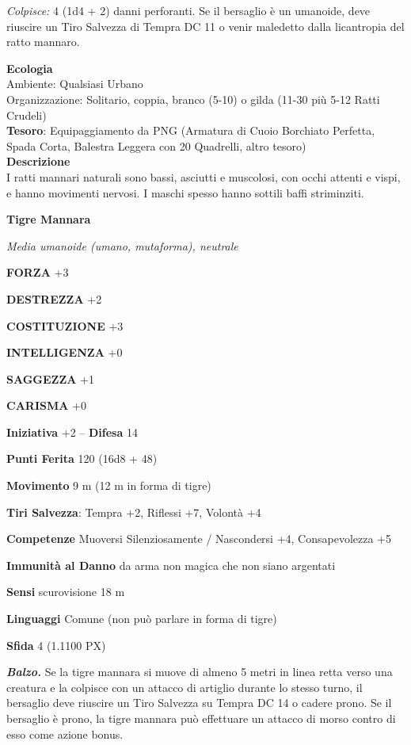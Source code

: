 \begin{multicols}{2}
	\textit{Colpisce:} 4 (1d4 + 2) danni perforanti. Se il bersaglio è un umanoide, deve riuscire un Tiro Salvezza di Tempra DC 11 o venir maledetto dalla licantropia del ratto mannaro.

	\textbf{Ecologia}\\
	Ambiente: Qualsiasi Urbano\\
	Organizzazione: Solitario, coppia, branco (5-10) o gilda (11-30 più 5-12 Ratti Crudeli)\\
	\textbf{Tesoro}: Equipaggiamento da PNG (Armatura di Cuoio Borchiato Perfetta, Spada Corta, Balestra Leggera con 20 Quadrelli, altro tesoro)\\
	\textbf{Descrizione}\\
	I ratti mannari naturali sono bassi, asciutti e muscolosi, con occhi attenti e vispi, e hanno movimenti nervosi. I maschi spesso hanno sottili baffi striminziti.

	\medskip{}\textbf{Tigre Mannara}

	\textit{Media umanoide (umano, mutaforma), neutrale}

	\textbf{FORZA} +3

	\textbf{DESTREZZA} +2

	\textbf{COSTITUZIONE} +3

	\textbf{INTELLIGENZA} +0

	\textbf{SAGGEZZA} +1

	\textbf{CARISMA} +0

	\textbf{Iniziativa} +2 -- \textbf{Difesa} 14

	\textbf{Punti Ferita} 120 (16d8 + 48)

	\textbf{Movimento} 9 m (12 m in forma di tigre)

	\textbf{Tiri Salvezza}: Tempra +2, Riflessi +7, Volontà +4

	\textbf{Competenze} Muoversi Silenziosamente / Nascondersi +4, Consapevolezza +5

	\textbf{Immunità al Danno} da arma non magica che non siano argentati

	\textbf{Sensi} scurovisione 18 m

	\textbf{Linguaggi} Comune (non può parlare in forma di tigre)

	\textbf{Sfida} 4 (1.1100 PX)

	\textit{\textbf{Balzo.}} Se la tigre mannara si muove di almeno 5 metri in linea retta verso una creatura e la colpisce con un attacco di artiglio durante lo stesso turno, il bersaglio deve riuscire un Tiro Salvezza su Tempra DC 14 o cadere prono. Se il bersaglio è prono, la tigre mannara può effettuare un attacco di morso contro di esso come azione bonus.


\end{multicols}
